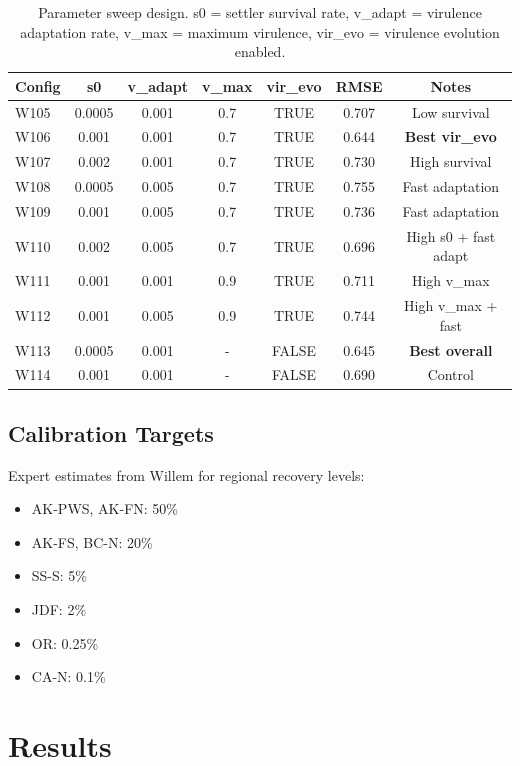 \documentclass[11pt,a4paper]{article}
\begin{document}
\begin{table}[H]
\centering
\begin{tabular}{lcccccc}
\toprule
Config & s0 & v\_adapt & v\_max & vir\_evo & RMSE & Notes \\
\midrule
W105 & 0.0005 & 0.001 & 0.7 & TRUE & 0.707 & Low survival \\
W106 & 0.001 & 0.001 & 0.7 & TRUE & 0.644 & \textbf{Best vir\_evo} \\
W107 & 0.002 & 0.001 & 0.7 & TRUE & 0.730 & High survival \\
W108 & 0.0005 & 0.005 & 0.7 & TRUE & 0.755 & Fast adaptation \\
W109 & 0.001 & 0.005 & 0.7 & TRUE & 0.736 & Fast adaptation \\
W110 & 0.002 & 0.005 & 0.7 & TRUE & 0.696 & High s0 + fast adapt \\
W111 & 0.001 & 0.001 & 0.9 & TRUE & 0.711 & High v\_max \\
W112 & 0.001 & 0.005 & 0.9 & TRUE & 0.744 & High v\_max + fast \\
W113 & 0.0005 & 0.001 & - & FALSE & 0.645 & \textbf{Best overall} \\
W114 & 0.001 & 0.001 & - & FALSE & 0.690 & Control \\
\bottomrule
\end{tabular}
\caption{Parameter sweep design. s0 = settler survival rate, v\_adapt = virulence adaptation rate, v\_max = maximum virulence, vir\_evo = virulence evolution enabled.}
\end{table}

\subsection{Calibration Targets}

Expert estimates from Willem for regional recovery levels:
\begin{itemize}
\item AK-PWS, AK-FN: 50\%
\item AK-FS, BC-N: 20\%  
\item SS-S: 5\%
\item JDF: 2\%
\item OR: 0.25\%
\item CA-N: 0.1\%
\end{itemize}

\section{Results}
\end{document}
